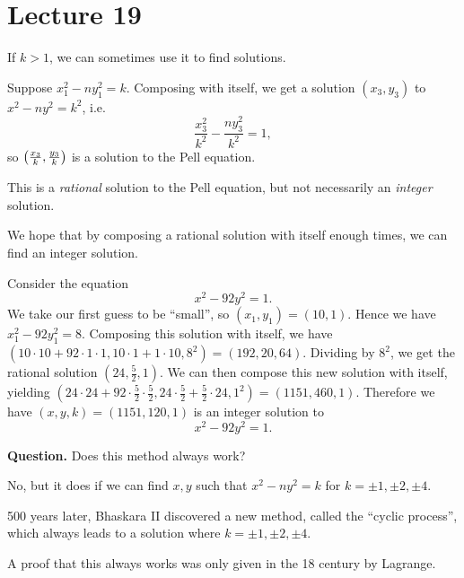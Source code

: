 \documentclass[class=article, crop=false]{standalone}
\begin{document}
  \section{Lecture 19}
  \begin{note}{}
    If $k > 1$, we can sometimes use it to find solutions.
  \end{note}
  Suppose $x_1^2 - ny_1^2 = k$. Composing with itself, we get a solution $(x_3, y_3)$ to $x^2 - ny^2 = k^2$, i.e.
  \[
    \frac{x_3^2}{k^2} - \frac{ny_3^2}{k^2} = 1,
  \]
  so $\left( \frac{x_3}{k}, \frac{y_3}{k} \right)$ is a solution to the Pell equation.
  \begin{note}{}
    This is a \emph{rational} solution to the Pell equation, but not necessarily an \emph{integer} solution.
  \end{note}
  We hope that by composing a rational solution with itself enough times, we can find an integer solution.
  \begin{example}{}
    Consider the equation
    \[
      x^2 - 92y^2 = 1.
    \]
    We take our first guess to be ``small'', so $(x_1, y_1) = (10, 1)$. Hence we have $x_1^2 - 92y_1^2 = 8$. Composing this solution with itself, we have $(10\cdot 10 + 92\cdot 1\cdot 1, 10\cdot 1 + 1\cdot 10, 8^2) = (192, 20, 64)$. Dividing by $8^2$, we get the rational solution $(24, \frac{5}{2}, 1)$. We can then compose this new solution with itself, yielding $(24\cdot 24 + 92\cdot \frac{5}{2}\cdot \frac{5}{2}, 24\cdot \frac{5}{2} + \frac{5}{2}\cdot 24, 1^2) = (1151, 460, 1)$. Therefore we have $(x, y, k) = (1151, 120, 1)$ is an integer solution to
    \[
      x^2 - 92y^2 = 1.
    \]
  \end{example}
  \textbf{Question.} Does this method always work? \par
  No, but it does if we can find $x, y$ such that $x^2 - ny^2 = k$ for $k = \pm 1, \pm 2, \pm 4$. \par
  500 years later, Bhaskara II discovered a new method, called the ``cyclic process'', which always leads to a solution where $k = \pm 1, \pm 2, \pm 4$.
  \begin{note}{}
    A proof that this always works was only given in the 18 century by Lagrange.
  \end{note}
\end{document}

